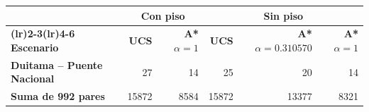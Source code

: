 \renewcommand{\arraystretch}{1.2}
\begin{tabular}{|l|r|r|r|r|r|}
\hline
\rowcolor{gray!20}  & \multicolumn{2}{c}{\textbf{Con piso}} & \multicolumn{3}{c}{\textbf{Sin piso}} \\
\hline
\rowcolor{gray!20} \textbf{\cmidrule(lr){2-3}\cmidrule(lr){4-6} \textbf{Escenario}} & \textbf{UCS} & \textbf{A* $\alpha=1$} & \textbf{UCS} & \textbf{A* $\alpha=0.310570$} & \textbf{A* $\alpha=1$} \\
\hline
\textbf{Duitama -- Puente Nacional} & 27 & 14 & 25 & 20 & 14 \\
\hline
\textbf{Suma de 992 pares} & 15872 & 8584 & 15872 & 13377 & 8321 \\
\hline
\end{tabular}
